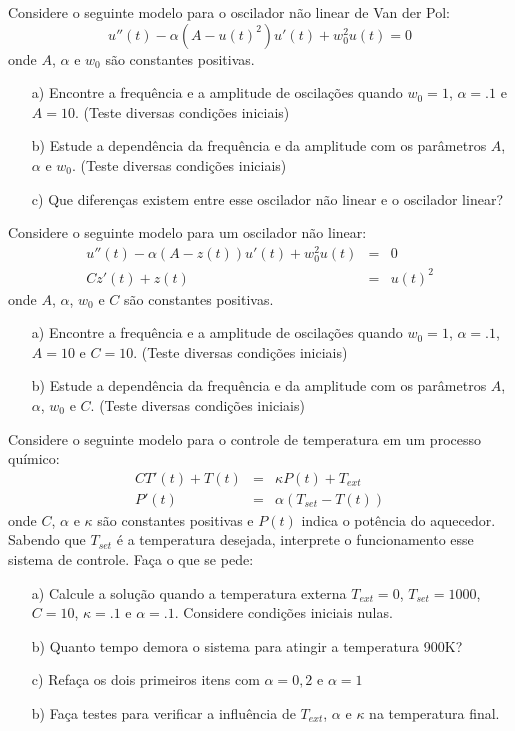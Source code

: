 \begin{exer} Considere o seguinte modelo para o oscilador não linear de Van der Pol:
$$u''(t) - \alpha (A-u(t)^2)u'(t) + w_0^2u(t)=0$$
onde $A$, $\alpha$ e $w_0$ são constantes positivas.
\begin{itemize}
\item[a)] Encontre a frequência e a amplitude de oscilações quando $w_0=1$, $\alpha=.1$ e $A=10$. (Teste diversas condições iniciais)
\item[b)] Estude a dependência da frequência e da amplitude com os parâmetros  $A$, $\alpha$ e $w_0$. (Teste diversas condições iniciais)
\item[c)] Que diferenças existem entre esse oscilador não linear e o oscilador linear?
\end{itemize}
\end{exer}

\begin{exer} Considere o seguinte modelo para um oscilador não linear:
\begin{eqnarray*}
u''(t)-\alpha(A-z(t))u'(t)+w_0^2 u(t)&=&0\\
Cz'(t)+z(t)&=&u(t)^2
\end{eqnarray*}
onde $A$, $\alpha$, $w_0$ e $C$ são constantes positivas.
\begin{itemize}
\item[a)] Encontre a frequência e a amplitude de oscilações quando $w_0=1$, $\alpha=.1$, $A=10$ e $C=10$. (Teste diversas condições iniciais)
\item[b)] Estude a dependência da frequência e da amplitude com os parâmetros  $A$, $\alpha$, $w_0$ e $C$. (Teste diversas condições iniciais)
\end{itemize}
\end{exer}

\begin{exer} Considere o seguinte modelo para o controle de temperatura em um processo químico:
\begin{eqnarray*}
CT'(t)+T(t)&=&\kappa P(t)+T_{ext}\\
P'(t)&=&\alpha(T_{set}-T(t))
\end{eqnarray*}
onde $C$, $\alpha$ e $\kappa$ são constantes positivas e $P(t)$ indica o potência do aquecedor. Sabendo que $T_{set}$ é a temperatura desejada, interprete o funcionamento esse sistema de controle. Faça o que se pede:
\begin{itemize}
\item[a)] Calcule a solução quando a temperatura externa $T_{ext}=0$, $T_{set}=1000$, $C=10$, $\kappa=.1$ e $\alpha=.1$. Considere condições iniciais nulas.
\item[b)] Quanto tempo demora o sistema para atingir a temperatura 900K?
\item[c)] Refaça os dois primeiros itens com $\alpha=0,2$ e $\alpha=1$
\item[b)] Faça testes para verificar a influência de $T_{ext}$, $\alpha$ e $\kappa$ na temperatura final.
\end{itemize}
\end{exer}

